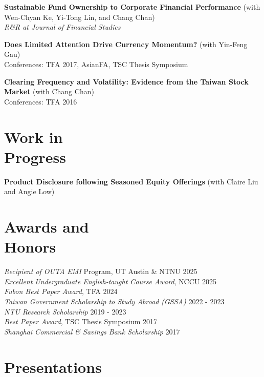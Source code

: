 \documentclass[margin]{res} %
\begin{document}
\begin{resume}
\textbf{Sustainable Fund Ownership to Corporate Financial Performance} (with Wen-Chyan Ke, Yi-Tong Lin, and Chang Chan) \\
\textit{R\&R at Journal of Financial Studies}

\textbf{Does Limited Attention Drive Currency Momentum?} (with Yin-Feng Gau) \\
Conferences: TFA 2017, AsianFA, TSC Thesis Symposium

\textbf{Clearing Frequency and Volatility: Evidence from the Taiwan Stock Market} (with Chang Chan) \\
Conferences: TFA 2016

\section{Work in \\ Progress}

\textbf{Product Disclosure following Seasoned Equity Offerings} (with Claire Liu and Angie Low) 


\section{Awards and \\ Honors} 

{\sl Recipient of OUTA EMI} Program, UT Austin \& NTNU \hfill 2025 \\
{\sl Excellent Undergraduate English-taught Course Award}, NCCU \hfill 2025 \\
{\sl Fubon Best Paper Award}, TFA  \hfill 2024 \\
{\sl Taiwan Government Scholarship to Study Abroad (GSSA)} \hfill 2022 - 2023 \\
{\sl NTU Research Scholarship} \hfill 2019 - 2023 \\
{\sl Best Paper Award}, TSC Thesis Symposium  \hfill 2017 \\
{\sl Shanghai Commercial \& Savings Bank Scholarship} \hfill 2017

\section{Presentations} 


\end{resume}
\end{document}
